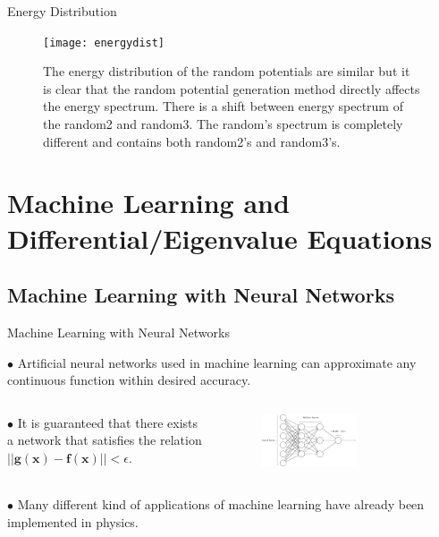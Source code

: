 \documentclass{beamer}
\begin{document}
\begin{frame}{Energy Distribution}
    \graphicspath{{"../figs/dataresults/"}}
    \begin{figure}[H]
        \centering
        \texttt{[image: energydist]}
    \caption{The energy distribution of the random potentials are similar but it is clear that the random potential generation method directly affects the energy spectrum. There is a shift between energy spectrum of the random2 and random3. The random's spectrum is completely different and contains both random2's and random3's.}
    \label{fig:energy_dist}
    \end{figure}
\end{frame}

\section{Machine Learning and Differential/Eigenvalue Equations}

\subsection{Machine Learning with Neural Networks}

\begin{frame}{Machine Learning with Neural Networks}

$\bullet$ Artificial neural networks used in machine learning can approximate any continuous function within desired accuracy.
\vskip 1cm

\begin{columns}
\begin{column}{0.40\textwidth}
\hspace*{0.2cm} $\bullet$ It is guaranteed that \hspace*{0.2cm} there exists
a network that \hspace*{0.2cm} satisfies the relation \hspace*{0.2cm} $||\boldsymbol{g}(\boldsymbol{x}) − \boldsymbol{f}(\boldsymbol{x})|| < \epsilon$.
\vskip 1cm
\end{column}
\begin{column}{0.8\textwidth}
    \begin{figure}[Htb!]
        \includegraphics[width=0.6\textwidth]{neuralnetworkex.png}
    \end{figure}
\end{column}
\end{columns}
\vskip 1cm

$\bullet$ Many different kind of applications of machine learning have already been implemented in physics.


\end{frame}
\end{document}
